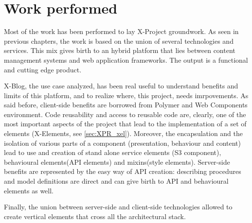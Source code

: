 \section{Work performed}
\label{sec:conclusions_work_performed}

Most of the work has been performed to lay X-Project groundwork. As seen in previous chapters, the work is based on the union of several technologies and services. This mix gives birth to an hybrid platform that lies between content management systems and web application frameworks.
The output is a functional and cutting edge product.

X-Blog, the use case analyzed, has been real useful to understand benefits and limits of this platform, and to realize where, this project, needs imrpovements.
As said before, client-side benefits are borrowed from Polymer and Web Components environment. Code reusability and access to reusable code are, clearly, one of the most important aspects of the project that lead to the implementation of a set of elements (X-Elements, see \ref{sec:XPR_xel}).
Moreover, the encapsulation and the isolation of various parts of a component (presentation, behaviour and content) lead to use and creation of stand alone service elements (S3 component), behavioural elements(API elements) and mixins(style elements).
Server-side benefits are represented by the easy way of API creation: describing procedures and model definitions are direct and can give birth to API and behavioural elements as well. 

Finally, the union between server-side and client-side technologies allowed to create vertical elements that cross all the architectural stack.
